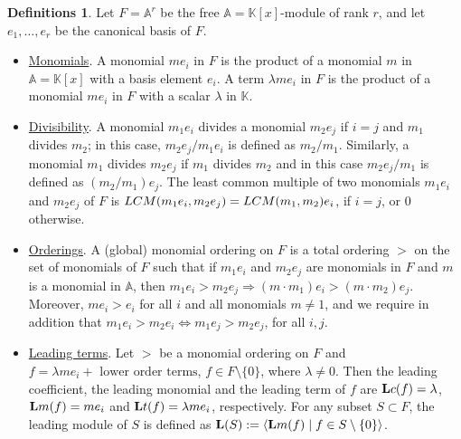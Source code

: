 \documentclass[10pt]{amsart}
\newcommand{\mbk}{\mbox{$\mathbb{K}$}}
\newcommand{\mba}{\mbox{$\mathbb{A}$}}
\newcommand{\lc}{\mbox{${\bf L}{\rm c}$}}
\newcommand{\lm}{\mbox{${\bf L}{\rm m}$}}
\newcommand{\lmod}{\mbox{${\bf L}$}}
\newcommand{\lt}{\mbox{${\bf L}{\rm t}$}}
\newcommand{\Lcm}{\mbox{${\rm LCM}$}}
\theoremstyle{definition}
\newtheorem{definitions}[cdrthm]{Definitions}
\theoremstyle{remark}
\begin{document}
\begin{definitions}\label{firstsetofdefinitions}
Let $F=\mba^r$ be the free $\mba=\mbk[x]$-module of rank $r$, and let
$e_1,\ldots ,e_r$ be the canonical basis of $F$.
\begin{itemize}
\item[$(1)$] \underline{\sc Monomials}. A monomial $me_i$ in $F$ is
  the product of a monomial $m$ in $\mba=\mbk[x]$ with a basis element
  $e_i$. A term $\lambda me_i$ in $F$ is the product of a monomial
  $me_i$ in $F$ with a scalar $\lambda$ in $\mbk$.
\item[$(2)$] \underline{\sc Divisibility}. A monomial $m_1e_i$ divides
  a monomial $m_2e_j$ if $i=j$ and $m_1$ divides $m_2$; in this case,
  $m_2e_j/m_1e_i$ is defined as $m_2/m_1$. Similarly, a monomial $m_1$
  divides $m_2e_j$ if $m_1$ divides $m_2$ and in this case
  $m_2e_j/m_1$ is defined as $(m_2/m_1)e_j$. The least common multiple
  of two monomials $m_1e_i$ and $m_2e_j$ of $F$ is
  $\Lcm(m_1e_i,m_2e_j)=\Lcm(m_1,m_2)e_i$, if $i=j$, or $0$ otherwise.
\item[$(3)$] \underline{\sc Orderings}. A (global) monomial ordering
  on $F$ is a total ordering $>$ on the set of monomials of $F$ such
  that if $m_1e_i$ and $m_2e_j$ are monomials in $F$ and $m$ is a
  monomial in $\mba$, then $m_1e_i> m_2e_j\Rightarrow (m\cdot m_1)e_i>
  (m\cdot m_2)e_j$. Moreover, $me_i>e_i$ for all $i$ and all monomials
  $m\neq 1$, and we require in addition that
  $m_1e_i>m_2e_i\Leftrightarrow m_1e_j>m_2e_j$, for all $i,j$.
\item[$(4)$] \underline{\sc Leading terms}. Let $>$ be a monomial
  ordering on $F$ and $f=\lambda me_i+\mbox{ lower order terms}$,
  $f\in F\setminus\{0\}$, where $\lambda\neq 0$. Then the leading
  coefficient, the leading monomial and the leading term of $f$ are
  $\lc(f)=\lambda$, $\lm(f)=me_i$ and $\lt(f)=\lambda me_i$,
  respectively. For any subset $S\subset F$, the leading module of $S$
  is defined as $\lmod(S):=\langle\lm(f)\mid f\in
  S\setminus\{0\}\rangle$.
\end{itemize}
\end{definitions}
\end{document}
